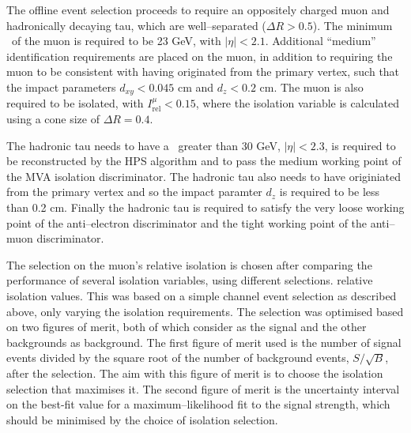 The offline event selection proceeds to require an oppositely charged
muon and hadronically decaying tau, which are well--separated ($\Delta R > 0.5$).
The minimum \pT~of the muon is required to be 23 GeV, with $|\eta| < 2.1$. %
Additional ``medium'' identification requirements are placed on the muon, in addition
to requiring the muon to be consistent with having originated from the primary vertex, such that
the impact parameters $d_{xy} < 0.045$ cm and $d_{z} < 0.2$ cm. The muon is also required
to be isolated, with $I_{\text{rel}}^{\mu} < 0.15$, where the isolation variable is calculated using
a cone size of $\Delta R = 0.4$.

The hadronic tau needs to have a \pT~greater than 30 GeV, $|\eta|<2.3$,
is required to be reconstructed by the HPS algorithm and to pass the medium
working point of the MVA isolation discriminator. The hadronic tau also needs
to have originiated from the primary vertex and so the impact paramter $d_{z}$ is 
required to be less than 0.2 cm. Finally the hadronic tau is required
to satisfy the very loose working point of the anti--electron discriminator
and the tight working point of the anti--muon discriminator.

The selection on the muon's relative isolation is chosen after comparing
the performance of several isolation variables, using different selections.
relative isolation values. This was based on a simple \mutau channel
event selection as described above, only varying the isolation requirements.
The selection was optimised based on two figures of merit, both of
which consider \Ztautau as the signal and the other backgrounds
as background. The first figure of merit used is the number of signal events divided by the
square root of the number of background events, $S/\sqrt{B}$, after
the selection. The aim with this figure of merit is to choose
the isolation selection that maximises it. The second figure of merit
is the uncertainty interval on the best-fit value for a maximum--likelihood fit
to the \Ztautau signal strength, which should be minimised by the choice of
isolation selection.


